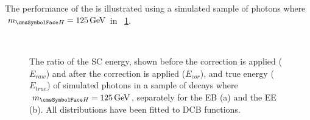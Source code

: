 The performance of the \PhoEnergyBdt is illustrated using a simulated sample of \Hgg photons where $\mH=125\GeV$ in \Fig~\ref{fig:reco:pho_regression}.

\begin{figure}[hp]
\centering
{}\\
\caption{The ratio of the SC energy, shown before the \PhoEnergyBdt correction is applied ($E_{raw}$) and after the correction is applied ($E_{cor}$), and true energy ($E_{true}$) of simulated photons in a sample of \Hgg decays where $\mH=125\GeV$, separately for the EB (a) and the EE (b). All distributions have been fitted to DCB functions.}

\label{fig:reco:pho_regression}
\end{figure}


